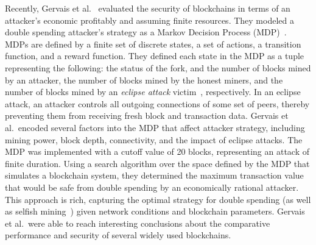 
Recently, Gervais et al.~\cite{Gervais:2016} evaluated the security of blockchains in terms of an attacker's economic profitably and assuming finite resources. They modeled a double spending attacker's strategy  as a Markov Decision Process (MDP)~\cite{Bellman:1957}. MDPs are defined by a finite set of discrete states, a set of actions, a transition function, and a reward function. They defined each  state in the MDP as a tuple representing the following: the status of the fork, and the number of blocks mined by an attacker,  the number of blocks mined by the honest miners, and  the number of blocks mined by an {\em eclipse attack} victim~\cite{Heilman:2015}, respectively. In an eclipse attack, an attacker controls all outgoing connections of some set of peers, thereby preventing them from receiving fresh block and transaction data. Gervais et al.\ encoded several factors into the MDP that affect  attacker strategy, including mining power, block depth, connectivity, and the impact of eclipse attacks. The MDP was implemented with a cutoff value of 20 blocks, representing an attack of finite duration. Using a search algorithm over the space defined by the MDP that simulates a blockchain system, they determined the maximum transaction value that would be safe from double spending by an economically rational attacker. This  approach is rich, capturing the optimal strategy for  double spending (as well as selfish mining~\cite{eyal:2014, sapirshtein:2015}) given  network conditions and blockchain parameters.  Gervais et al.\ were able to reach interesting conclusions about the comparative performance and security of several widely used blockchains.

